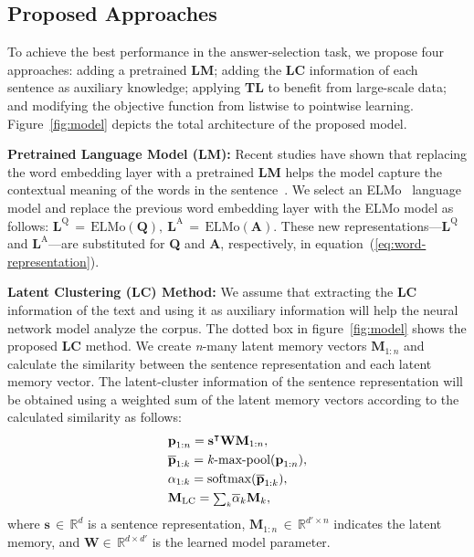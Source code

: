 \documentclass[sigconf]{acmart}
\begin{document}
\subsection{Proposed Approaches}
\label{ssec:proposed-approaches}
To achieve the best performance in the answer-selection task, we propose four approaches: adding a pretrained \textbf{LM}; adding the \textbf{LC} information of each sentence as auxiliary knowledge; applying \textbf{TL} to benefit from large-scale data; and modifying the objective function from listwise to pointwise learning. Figure~\ref{fig:model} depicts the total architecture of the proposed model.


\vspace*{2mm}
\noindent\textbf{Pretrained Language Model (LM): }
Recent studies have shown that replacing the word embedding layer with a pretrained \textbf{LM} helps the model capture the contextual meaning of the words in the sentence~\cite{peters2018deep,devlin2019bert}. We select an ELMo~\cite{peters2018deep} language model and replace the previous word embedding layer with the ELMo model as follows:
$\textbf{L}^{\text{Q}}\,{=}\,\text{ELMo}(\textbf{Q}),~\textbf{L}^{\text{A}}\,{=}\,\text{ELMo}(\textbf{A})$. 
These new representations—$\textbf{L}^{\text{Q}}$ and $\textbf{L}^{\text{A}}$—are substituted for \textbf{Q} and \textbf{A}, respectively, in equation~(\ref{eq:word-representation}).

\vspace*{2mm}
\noindent\textbf{Latent Clustering (LC) Method: }
We assume that extracting the \textbf{LC} information of the text and using it as auxiliary information will help the neural network model analyze the corpus.
The dotted box in figure~\ref{fig:model} shows the proposed \textbf{LC} method.
We create \textit{n}-many latent memory vectors $\textbf{M}_{1:n}$ and calculate the similarity between the sentence representation and each latent memory vector. 
The latent-cluster information of the sentence representation will be obtained using a weighted sum of the latent memory vectors according to the calculated similarity as follows:
\begin{equation}
\begin{aligned}
& \textbf{p}_{1:n} = {\textbf{s}}^{\intercal}\textbf{W}\textbf{M}_{1:n}, \\
& \overline{\textbf{p}}_{1:k} = \text{\textit{k}-max-pool}(\textbf{p}_{1:n}), \\
& \alpha_{1:k} = \text{softmax}(\overline{\textbf{p}}_{1:k}), \\
& \textbf{M}_{\text{LC}}={\scriptstyle\sum_k}\overline{\alpha}_k{\textbf{M}_k},
\end{aligned}
\label{eq:kLC}
\end{equation}
where $\textbf{s}\,{\in}\,\mathbb{R}^{d}$ is a sentence representation, $\textbf{M}_{1:n}\,{\in}\,\mathbb{R}^{d'\times n}$ indicates the latent memory, and $\textbf{W}{\in}\,\mathbb{R}^{d \times d'}$ is the learned model parameter.
\end{document}
